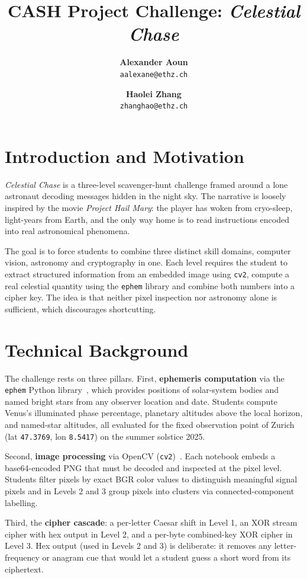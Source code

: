 \documentclass[10pt,twocolumn]{article}
\title{\textbf{CASH Project Challenge: \textit{Celestial Chase}}}
\author{
    \begin{tabular}{c}
        \textbf{Alexander Aoun} \\
        \texttt{aalexane@ethz.ch}
    \end{tabular}
    \and
    \begin{tabular}{c}
        \textbf{Haolei Zhang} \\
        \texttt{zhanghao@ethz.ch}
    \end{tabular}
}
\date{}
\begin{document}
\maketitle

\section{Introduction and Motivation}

\textit{Celestial Chase} is a three-level scavenger-hunt challenge framed around a lone astronaut decoding messages hidden in the night sky. The narrative is loosely inspired by the movie \textit{Project Hail Mary}: the player has woken from cryo-sleep, light-years from Earth, and the only way home is to read instructions encoded into real astronomical phenomena.

The goal is to force students to combine three distinct skill domains, computer vision, astronomy and cryptography in one. Each level requires the student to extract structured information from an embedded image using \texttt{cv2}, compute a real celestial quantity using the \texttt{ephem} library and combine both numbers into a cipher key. The idea is that neither pixel inspection nor astronomy alone is sufficient, which discourages shortcutting.

\section{Technical Background}

The challenge rests on three pillars. First, \textbf{ephemeris computation} via the \texttt{ephem} Python library~\cite{ephem}, which provides positions of solar-system bodies and named bright stars from any observer location and date. Students compute Venus's illuminated phase percentage, planetary altitudes above the local horizon, and named-star altitudes, all evaluated for the fixed observation point of Zurich (lat \texttt{47.3769}, lon \texttt{8.5417}) on the summer solstice 2025.

Second, \textbf{image processing} via OpenCV (\texttt{cv2})~\cite{opencv}. Each notebook embeds a base64-encoded PNG that must be decoded and inspected at the pixel level. Students filter pixels by exact BGR color values to distinguish meaningful signal pixels and in Levels 2 and 3 group pixels into clusters via connected-component labelling.

Third, the \textbf{cipher cascade}: a per-letter Caesar shift in Level 1, an XOR stream cipher with hex output in Level 2, and a per-byte combined-key XOR cipher in Level 3. Hex output (used in Levels 2 and 3) is deliberate: it removes any letter-frequency or anagram cue that would let a student guess a short word from its ciphertext.
\end{document}
